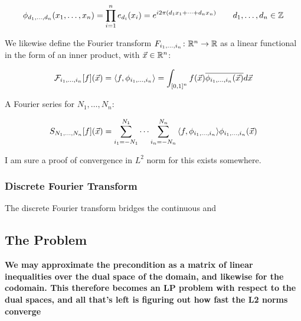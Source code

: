 \documentclass[12pt]{article}
\begin{document}
\begin{align*}
  \phi_{d_1, \ldots, d_n} {\left(x_1, \ldots, x_n\right)}
    = \prod_{i = 1}^{n} e_{d_i} {\left(x_i\right)}
    = e^{i 2 \pi {\left(d_1 x_1 + \cdots + d_n x_n\right)}}
    \qquad
    d_1, \ldots, d_n \in {\mathbb{Z}}
\end{align*}

We likewise define the
Fourier transform ${F_{i_1, \ldots, i_n} \colon {\mathbb{R}}^n \to {\mathbb{R}}}$ as a
linear functional in the form of an inner product,
with $\vec{x} \in {\mathbb{R}}^n$:

\begin{align*}
  \mathcal{F}_{i_1, \ldots, i_n} {\left[f\right]} {\left(\vec{x}\right)}
    = {\left\langle f, \phi_{i_1, \ldots, i_n}\right\rangle}
    = \int_{{\left[0, 1\right]}^n}
      f{\left(\vec{x}\right)} \overline{\phi_{i_1, \ldots, i_n} {\left(\vec{x}\right)}} d \vec{x}
\end{align*}

A Fourier series for $N_1, \ldots, N_n$:

\begin{align*}
  S_{N_1, \ldots, N_n} {\left[f\right]} {\left(\vec{x}\right)}
    = \sum_{i_1 = -N_1}^{N_1} \cdots \sum_{i_n = -N_n}^{N_n}
        {\left\langle f, \phi_{i_1, \ldots, i_n}\right\rangle} \phi_{i_1, \ldots, i_n}
          {\left(\vec{x}\right)}
\end{align*}

I am sure a proof of convergence in $L^2$ norm for this exists somewhere.


\subsubsection{Discrete Fourier Transform}
The discrete Fourier transform bridges the continuous and 


\subsection{The Problem}


\textbf{We may approximate the precondition as a matrix of linear inequalities
over the dual space of the domain, and likewise for the codomain.
This therefore becomes an LP problem with respect to the dual spaces, and
all that's left is figuring out how fast the L2 norms converge}
\end{document}

